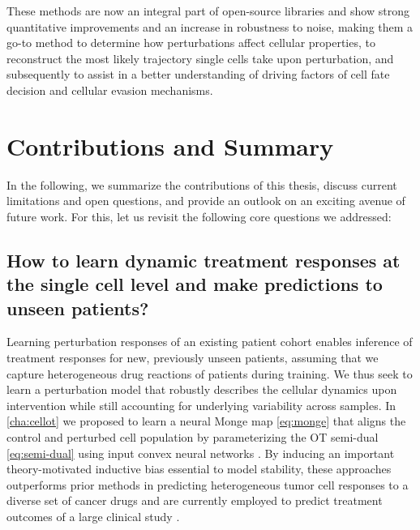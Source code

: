 These methods are now an integral part of open-source libraries \citep{cuturi2022optimal, klein2023mapping} and show strong quantitative improvements and an increase in robustness to noise, making them a go-to method to determine how perturbations affect cellular properties, to reconstruct the most likely trajectory single cells take upon perturbation, and subsequently to assist in a better understanding of driving factors of cell fate decision and cellular evasion mechanisms.

\section*{Contributions and Summary}

In the following, we summarize the contributions of this thesis, discuss current limitations and open questions, and provide an outlook on an exciting avenue of future work.
For this, let us revisit the following core questions we addressed:

\subsection*{\textbf{How to learn dynamic treatment responses at the single cell level and make predictions to unseen patients?}}

 Learning perturbation responses of an existing patient cohort enables inference of treatment responses for new, previously unseen patients, assuming that we capture heterogeneous drug reactions of patients during training.
We thus seek to learn a perturbation model that robustly describes the cellular dynamics upon intervention while still accounting for underlying variability across samples.
In \cref{cha:cellot} we proposed to learn a neural Monge map \eqref{eq:monge} that aligns the control and perturbed cell population by parameterizing the OT semi-dual \eqref{eq:semi-dual} using input convex neural networks \citep{bunne2021learning, makkuva2020optimal, amos2017input}.
By inducing an important theory-motivated inductive bias essential to model stability, these approaches outperforms prior methods in predicting heterogeneous tumor cell responses to a diverse set of cancer drugs and are currently employed to predict treatment outcomes of a large clinical study \citep{irmisch2021tumor}.

